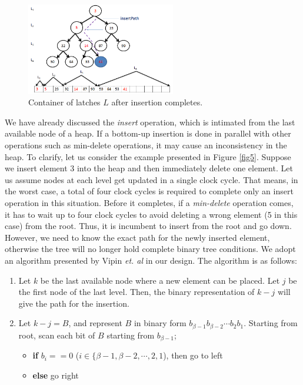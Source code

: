\documentclass[10pt, conference, compsocconf]{IEEEtran}
\begin{document}
\begin{figure}[!ht]
  \centering
  \includegraphics[width=6.5cm]{Figures/7.png}
      \caption{Container of latches $L$ after insertion completes.}
    \label{fig7}
\end{figure}

We have already discussed the {\it insert} operation, which is intimated from the last available node of a heap.
If a bottom-up insertion is done in parallel with other operations such as min-delete operations, it may cause an inconsistency in the heap.
To clarify, let us consider the example presented in Figure \ref{fig5}.
Suppose we insert element $3$ into the heap and then immediately delete one element.
Let us assume nodes at each level get updated in a single clock cycle.
That means, in the worst case, a total of four clock cycles is required to complete only an insert operation in this situation.
Before it completes, if a {\it min-delete} operation comes, it has to wait up to four clock cycles to avoid deleting a wrong element (5 in this case) from the root.
Thus, it is incumbent to insert from the root and go down.
However, we need to know the exact path for the newly inserted element, otherwise the tree will no longer hold complete binary tree conditions.
We adopt an algorithm presented by Vipin {\it et. al} \cite{pq6} in our design. The algorithm is as follows:

\begin{enumerate}
\item Let $k$ be the last available node where a new element can be placed. Let $j$ be the first node of the last level. Then, the binary representation of $k-j$ will give the path for the insertion.
\item Let $k-j = B$, and represent $B$ in binary form $b_{\beta-1}b_{\beta-2} \cdots b_2b_1$. Starting from root, scan each bit of $B$ starting from $b_{\beta-1}$;
    \begin{itemize}
    \item {\bf if} $b_i == 0$ ($i \in \{\beta-1,\beta-2, \cdots, 2,1$), then go to left
    \item {\bf else} go right
    \end{itemize}
\end{enumerate}
\end{document}
